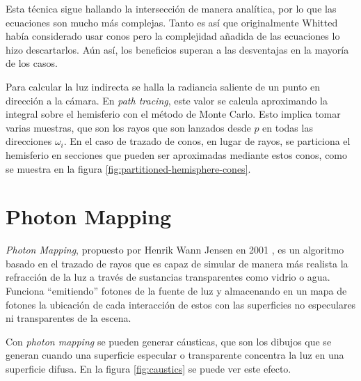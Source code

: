 Esta técnica sigue hallando la intersección de manera analítica, por lo que las ecuaciones son mucho más complejas.
Tanto es así que originalmente Whitted había considerado usar conos pero la complejidad añadida de las ecuaciones lo hizo descartarlos.
Aún así, los beneficios superan a las desventajas en la mayoría de los casos.

Para calcular la luz indirecta se halla la radiancia saliente de un punto en dirección a la cámara.
En \textit{path tracing}, este valor se calcula aproximando la integral sobre el hemisferio con el método de Monte Carlo.
Esto implica tomar varias muestras, que son los rayos que son lanzados desde $p$ en todas las direcciones $\omega_i$.
En el caso de trazado de conos, en lugar de rayos, se particiona el hemisferio en secciones que pueden ser aproximadas mediante estos conos, como se muestra en la figura \ref{fig:partitioned-hemisphere-cones}.

\section{Photon Mapping}\label{sec:photon-mapping}

\textit{Photon Mapping}, propuesto por Henrik Wann Jensen en 2001 \cite{photon-mapping}, es un algoritmo basado en el trazado de rayos que es capaz de simular de manera más realista la refracción de la luz a través de sustancias transparentes como vidrio o agua. 
Funciona ``emitiendo'' fotones de la fuente de luz y almacenando en un mapa de fotones la ubicación de cada interacción de estos con las superficies no especulares ni transparentes de la escena.

Con \textit{photon mapping} se pueden generar cáusticas, que son los dibujos que se generan cuando una superficie especular o transparente concentra la luz en una superficie difusa.
En la figura \ref{fig:caustics} se puede ver este efecto.

